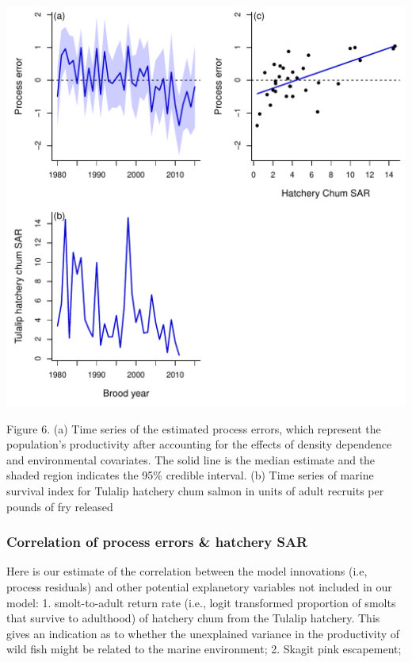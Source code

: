 \documentclass[11pt,]{article}
\begin{document}
\begin{center}\includegraphics{App_3_Summarize_results_files/figure-latex/fig_5_proc_err_1-1} \end{center}

Figure 6. (a) Time series of the estimated process errors, which
represent the population's productivity after accounting for the effects
of density dependence and environmental covariates. The solid line is
the median estimate and the shaded region indicates the 95\% credible
interval. (b) Time series of marine survival index for Tulalip hatchery
chum salmon in units of adult recruits per pounds of fry released

\subsubsection{Correlation of process errors \& hatchery
SAR}\label{correlation-of-process-errors-hatchery-sar}

Here is our estimate of the correlation between the model innovations
(i.e, process residuals) and other potential explanetory variables not
included in our model: 1. smolt-to-adult return rate (i.e., logit
transformed proportion of smolts that survive to adulthood) of hatchery
chum from the Tulalip hatchery. This gives an indication as to whether
the unexplained variance in the productivity of wild fish might be
related to the marine environment; 2. Skagit pink escapement;
\end{document}
